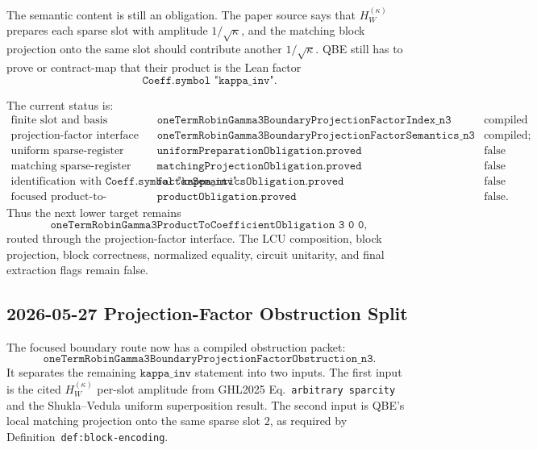 The semantic content is still an obligation.  The paper source says that
\(H_W^{(\kappa)}\) prepares each sparse slot with amplitude
\(1/\sqrt{\kappa}\), and the matching block projection onto the same slot
should contribute another \(1/\sqrt{\kappa}\).  QBE still has to prove or
contract-map that their product is the Lean factor
\[
  \texttt{Coeff.symbol "kappa\_inv"}.
\]

The current status is:
\[
\begin{array}{lll}
\text{finite slot and basis agreement} &
\texttt{oneTermRobinGamma3BoundaryProjectionFactorIndex\_n3} &
\text{compiled}\\
\text{projection-factor interface} &
\texttt{oneTermRobinGamma3BoundaryProjectionFactorSemantics\_n3} &
\text{compiled; semantic fields false}\\
\text{uniform sparse-register preparation} &
\texttt{uniformPreparationObligation.proved} & \text{false}\\
\text{matching sparse-register projection} &
\texttt{matchingProjectionObligation.proved} & \text{false}\\
\text{identification with }\texttt{Coeff.symbol "kappa\_inv"} &
\texttt{factorSemanticsObligation.proved} & \text{false}\\
\text{focused product-to-coefficient theorem} &
\texttt{productObligation.proved} & \text{false}.
\end{array}
\]
Thus the next lower target remains
\[
  \texttt{oneTermRobinGamma3ProductToCoefficientObligation 3 0 0},
\]
routed through the projection-factor interface.  The LCU composition, block
projection, block correctness, normalized equality, circuit unitarity, and
final extraction flags remain false.

\subsection{2026-05-27 Projection-Factor Obstruction Split}

The focused boundary route now has a compiled obstruction packet:
\[
  \texttt{oneTermRobinGamma3BoundaryProjectionFactorObstruction\_n3}.
\]
It separates the remaining \(\texttt{kappa\_inv}\) statement into two inputs.
The first input is the cited \(H_W^{(\kappa)}\) per-slot amplitude from
GHL2025 Eq.~\texttt{arbitrary sparcity} and the Shukla--Vedula uniform
superposition result.  The second input is QBE's local matching projection
onto the same sparse slot \(2\), as required by Definition~\texttt{def:block-encoding}.

